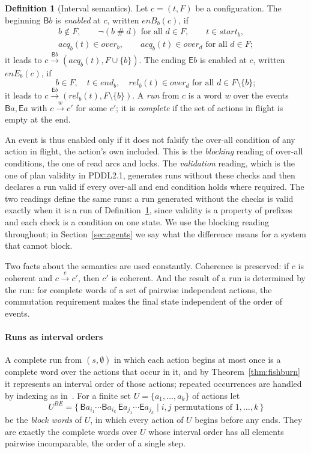\documentclass[preprint,12pt]{elsarticle}
\theoremstyle{plain}
\theoremstyle{definition}
\newtheorem{definition}[theorem]{Definition}
\newcommand{\st}{\mathit{start}}
\newcommand{\ovr}{\mathit{over}}
\newcommand{\stp}{\mathit{end}}
\newcommand{\acq}{\mathit{acq}}
\newcommand{\rel}{\mathit{rel}}
\newcommand{\conf}{\mathrel{\#}}
\newcommand{\B}[1]{\mathsf{B}#1}
\newcommand{\E}[1]{\mathsf{E}#1}
\newcommand{\istep}[1]{\xrightarrow{#1}}
\newcommand{\BE}[1]{#1^{\mathit{BE}}}
\newcommand{\enB}[2]{\mathit{enB}_{#1}(#2)}
\newcommand{\enE}[2]{\mathit{enE}_{#1}(#2)}
\begin{document}
\begin{definition}[Interval semantics]
\label{def:interval}
Let $c = (t, F)$ be a configuration. The beginning $\B{b}$ is \emph{enabled} at $c$, written $\enB{b}{c}$, if
\[
\begin{gathered}
b \notin F,\qquad \neg (b \conf d) \text{ for all } d \in F,\qquad t \in \st_b,\\
\acq_b(t) \in \ovr_b,\qquad \acq_b(t) \in \ovr_d \text{ for all } d \in F ;
\end{gathered}
\]
it leads to $c \istep{\B{b}} (\acq_b(t), F \cup \{b\})$. The ending $\E{b}$ is enabled at $c$, written $\enE{b}{c}$, if
\[
b \in F,\quad t \in \stp_b,\quad \rel_b(t) \in \ovr_d \text{ for all } d \in F \setminus \{b\} ;
\]
it leads to $c \istep{\E{b}} (\rel_b(t), F \setminus \{b\})$. A \emph{run} from $c$ is a word $w$ over the events $\B{a}, \E{a}$ with $c \istep{w} c'$ for some $c'$; it is \emph{complete} if the set of actions in flight is empty at the end.
\end{definition}

An event is thus enabled only if it does not falsify the over-all condition of any action in flight, the action's own included. This is the \emph{blocking} reading of over-all conditions, the one of read arcs and locks. The \emph{validation} reading, which is the one of plan validity in PDDL2.1, generates runs without these checks and then declares a run valid if every over-all and end condition holds where required. The two readings define the same runs: a run generated without the checks is valid exactly when it is a run of Definition~\ref{def:interval}, since validity is a property of prefixes and each check is a condition on one state. We use the blocking reading throughout; in Section~\ref{sec:agents} we say what the difference means for a system that cannot block.

Two facts about the semantics are used constantly. Coherence is preserved: if $c$ is coherent and $c \istep{e} c'$, then $c'$ is coherent. And the result of a run is determined by the run: for complete words of a set of pairwise independent actions, the commutation requirement makes the final state independent of the order of events.

\paragraph{Runs as interval orders}
A complete run from $(s, \emptyset)$ in which each action begins at most once is a complete word over the actions that occur in it, and by Theorem~\ref{thm:fishburn} it represents an interval order of those actions; repeated occurrences are handled by indexing as in~\cite{AlqarniJanicki2018}. For a finite set $U = \{a_1, \dots, a_k\}$ of actions let
\[
\BE{U} = \{\, \B{a_{i_1}} \cdots \B{a_{i_k}}\, \E{a_{j_1}} \cdots \E{a_{j_k}} \mid i, j \text{ permutations of } 1, \dots, k \,\}
\]
be the \emph{block words} of $U$, in which every action of $U$ begins before any ends. They are exactly the complete words over $U$ whose interval order has all elements pairwise incomparable, the order of a single step.
\end{document}
